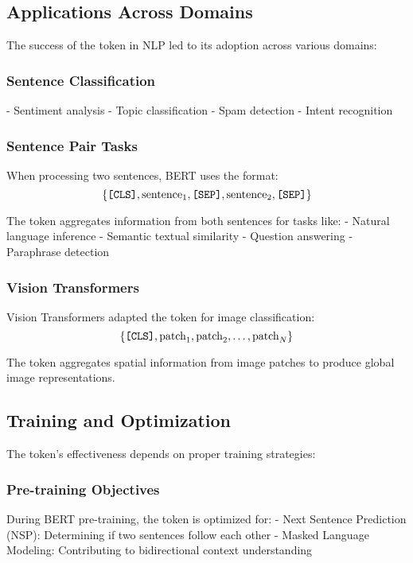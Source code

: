\subsection{Applications Across Domains}

The success of the \cls{} token in NLP led to its adoption across various domains:

\subsubsection{Sentence Classification}
- Sentiment analysis
- Topic classification  
- Spam detection
- Intent recognition

\subsubsection{Sentence Pair Tasks}
When processing two sentences, BERT uses the format:
$$\{\texttt{[CLS]}{}, \text{sentence}_1, \texttt{[SEP]}{}, \text{sentence}_2, \texttt{[SEP]}{}\}$$

The \cls{} token aggregates information from both sentences for tasks like:
- Natural language inference
- Semantic textual similarity
- Question answering
- Paraphrase detection

\subsubsection{Vision Transformers}
Vision Transformers \citep{dosovitskiy2020image} adapted the \cls{} token for image classification:
$$\{\texttt{[CLS]}{}, \text{patch}_1, \text{patch}_2, \ldots, \text{patch}_N\}$$

The \cls{} token aggregates spatial information from image patches to produce global image representations.

\subsection{Training and Optimization}

The \cls{} token's effectiveness depends on proper training strategies:

\subsubsection{Pre-training Objectives}
During BERT pre-training, the \cls{} token is optimized for:
- Next Sentence Prediction (NSP): Determining if two sentences follow each other
- Masked Language Modeling: Contributing to bidirectional context understanding

